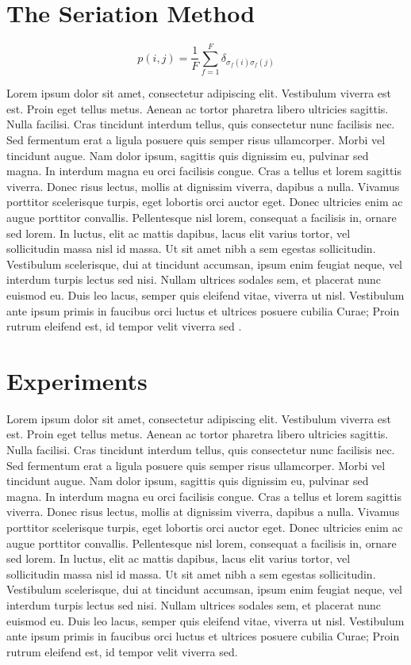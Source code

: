 \documentclass[graybox,natbib]{svmult}
\begin{document}
\section{The Seriation Method}\label{the-seriation-method}

\begin{equation}\label{eq:axelrod}p(i,j) = \frac{1}{F} \sum_{f=1}^{F} \delta_{\sigma_f(i)\sigma_f(j)}\end{equation}

Lorem ipsum dolor sit amet, consectetur adipiscing elit. Vestibulum
viverra est est. Proin eget tellus metus. Aenean ac tortor pharetra
libero ultricies sagittis. Nulla facilisi. Cras tincidunt interdum
tellus, quis consectetur nunc facilisis nec. Sed fermentum erat a ligula
posuere quis semper risus ullamcorper. Morbi vel tincidunt augue. Nam
dolor ipsum, sagittis quis dignissim eu, pulvinar sed magna. In interdum
magna eu orci facilisis congue. Cras a tellus et lorem sagittis viverra.
Donec risus lectus, mollis at dignissim viverra, dapibus a nulla.
Vivamus porttitor scelerisque turpis, eget lobortis orci auctor eget.
Donec ultricies enim ac augue porttitor convallis. Pellentesque nisl
lorem, consequat a facilisis in, ornare sed lorem. In luctus, elit ac
mattis dapibus, lacus elit varius tortor, vel sollicitudin massa nisl id
massa. Ut sit amet nibh a sem egestas sollicitudin. Vestibulum
scelerisque, dui at tincidunt accumsan, ipsum enim feugiat neque, vel
interdum turpis lectus sed nisi. Nullam ultrices sodales sem, et
placerat nunc euismod eu. Duis leo lacus, semper quis eleifend vitae,
viverra ut nisl. Vestibulum ante ipsum primis in faucibus orci luctus et
ultrices posuere cubilia Curae; Proin rutrum eleifend est, id tempor
velit viverra sed \citep{mayr1959mayr}.

\section{Experiments}\label{experiments}

Lorem ipsum dolor sit amet, consectetur adipiscing elit. Vestibulum
viverra est est. Proin eget tellus metus. Aenean ac tortor pharetra
libero ultricies sagittis. Nulla facilisi. Cras tincidunt interdum
tellus, quis consectetur nunc facilisis nec. Sed fermentum erat a ligula
posuere quis semper risus ullamcorper. Morbi vel tincidunt augue. Nam
dolor ipsum, sagittis quis dignissim eu, pulvinar sed magna. In interdum
magna eu orci facilisis congue. Cras a tellus et lorem sagittis viverra.
Donec risus lectus, mollis at dignissim viverra, dapibus a nulla.
Vivamus porttitor scelerisque turpis, eget lobortis orci auctor eget.
Donec ultricies enim ac augue porttitor convallis. Pellentesque nisl
lorem, consequat a facilisis in, ornare sed lorem. In luctus, elit ac
mattis dapibus, lacus elit varius tortor, vel sollicitudin massa nisl id
massa. Ut sit amet nibh a sem egestas sollicitudin. Vestibulum
scelerisque, dui at tincidunt accumsan, ipsum enim feugiat neque, vel
interdum turpis lectus sed nisi. Nullam ultrices sodales sem, et
placerat nunc euismod eu. Duis leo lacus, semper quis eleifend vitae,
viverra ut nisl. Vestibulum ante ipsum primis in faucibus orci luctus et
ultrices posuere cubilia Curae; Proin rutrum eleifend est, id tempor
velit viverra sed.
\end{document}
